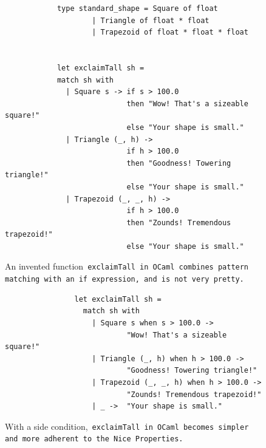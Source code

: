 \documentclass[article,screen,12pt, nonacm]{acmart}
\begin{document}
        \begin{figure}[ht]
        \begin{verbatim}
            type standard_shape = Square of float 
                    | Triangle of float * float
                    | Trapezoid of float * float * float
                    

            let exclaimTall sh =
            match sh with 
              | Square s -> if s > 100.0 
                            then "Wow! That's a sizeable square!"
                            else "Your shape is small." 
              | Triangle (_, h) -> 
                            if h > 100.0 
                            then "Goodness! Towering triangle!"
                            else "Your shape is small." 
              | Trapezoid (_, _, h) -> 
                            if h > 100.0
                            then "Zounds! Tremendous trapezoid!"
                            else "Your shape is small." 
            \end{verbatim}    
        \caption{An invented function~\tt{exclaimTall} in OCaml combines pattern
        matching with an~\tt{if} expression, and is not very pretty.}   
        \label{fig:ifexclaimtall}
    \end{figure}


       \begin{figure}[]
            \begin{verbatim}
                let exclaimTall sh =
                  match sh with 
                    | Square s when s > 100.0 ->
                            "Wow! That's a sizeable square!"
                    | Triangle (_, h) when h > 100.0 ->
                            "Goodness! Towering triangle!"
                    | Trapezoid (_, _, h) when h > 100.0 -> 
                            "Zounds! Tremendous trapezoid!"
                    | _ ->  "Your shape is small." 
                \end{verbatim}
            \caption{With a side condition,~\tt{exclaimTall} in OCaml becomes
            simpler and more adherent to the Nice~Properties.} 
            \label{fig:whenexclaimtall}
        \end{figure}
\end{document}
